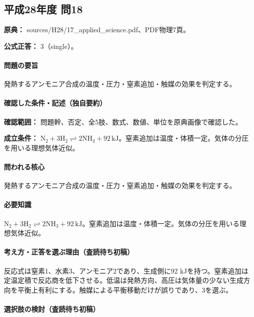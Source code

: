 \subsection{平成28年度 問18}
\label{q:h28-reg-applied-18}

\noindent\textbf{原典：} sources/H28/17\_applied\_science.pdf、PDF物理7頁。

\textbf{公式正答：} 3（single）。

\paragraph{問題の要旨} 発熱するアンモニア合成の温度・圧力・窒素追加・触媒の効果を判定する。

\paragraph{確認した条件・記述（独自要約）}\mbox{}\par

\noindent\textbf{確認範囲：} 問題幹、否定、全5肢、数式、数値、単位を原典画像で確認した。\par

\noindent\textbf{成立条件：} \(\mathrm{N_2+3H_2\rightleftharpoons2NH_3}+92\,\mathrm{kJ}\)。窒素追加は温度・体積一定。気体の分圧を用いる理想気体近似。\par

\paragraph{問われる核心} 発熱するアンモニア合成の温度・圧力・窒素追加・触媒の効果を判定する。

\paragraph{必要知識} \(\mathrm{N_2+3H_2\rightleftharpoons2NH_3}+92\,\mathrm{kJ}\)。窒素追加は温度・体積一定。気体の分圧を用いる理想気体近似。

\paragraph{考え方・正答を選ぶ理由（査読待ち初稿）} 反応式は窒素1、水素3、アンモニア2であり、生成側に92 kJを持つ。窒素追加は定温定積で反応商を低下させる。低温は発熱方向、高圧は気体量の少ない生成方向を平衡上有利にする。触媒による平衡移動だけが誤りであり、3を選ぶ。

\paragraph{選択肢の検討（査読待ち初稿）}\mbox{}\par


